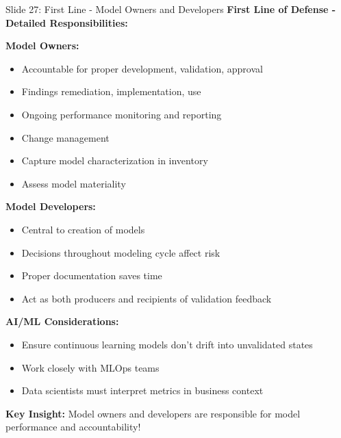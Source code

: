 \documentclass[8pt]{beamer}
\begin{document}
	\begin{frame}{Slide 27: First Line - Model Owners and Developers}
		\fontsize{6.5}{7.5}\selectfont
		\textbf{First Line of Defense - Detailed Responsibilities:}
		
		\vspace{0.1cm}
		\textbf{Model Owners:}
		\begin{itemize}
			\item Accountable for proper development, validation, approval
			\item Findings remediation, implementation, use
			\item Ongoing performance monitoring and reporting
			\item Change management
			\item Capture model characterization in inventory
			\item Assess model materiality
		\end{itemize}
		
		\vspace{0.1cm}
		\textbf{Model Developers:}
		\begin{itemize}
			\item Central to creation of models
			\item Decisions throughout modeling cycle affect risk
			\item Proper documentation saves time
			\item Act as both producers and recipients of validation feedback
		\end{itemize}
		
		\vspace{0.1cm}
		\textbf{AI/ML Considerations:}
		\begin{itemize}
			\item Ensure continuous learning models don't drift into unvalidated states
			\item Work closely with MLOps teams
			\item Data scientists must interpret metrics in business context
		\end{itemize}
		
		\textcolor{myblue}{\textbf{Key Insight:}} Model owners and developers are \textcolor{myblue}{responsible for model performance and accountability}!
	\end{frame}
	
\end{document}
